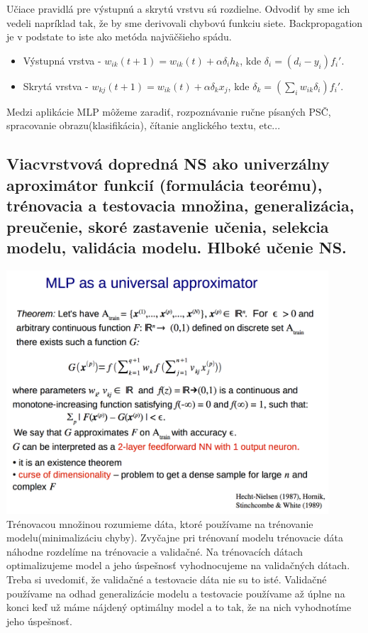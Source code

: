 \documentclass{article}
\numberwithin{equation}{section} %
\begin{document}
Učiace pravidlá pre výstupnú a skrytú vrstvu sú rozdielne. Odvodiť by sme ich vedeli napríklad tak, že by sme derivovali chybovú funkciu siete. Backpropagation je v podstate to iste ako metóda najväčšieho spádu.
\begin{itemize}
\item Výstupná vrstva - $ w_{ik}(t+1) = w_{ik}(t) + \alpha\delta_ih_k $, kde $\delta_i = (d_i - y_i)f_i'$.
\item Skrytá vrstva - $ w_{kj}(t+1) = w_{ik}(t) + \alpha\delta_kx_j $, kde $\delta_k = (\sum_iw_{ik}\delta_i)f_i'$.
\end{itemize}
Medzi aplikácie MLP môžeme zaradiť, rozpoznávanie ručne písaných PSČ, spracovanie obrazu(klasifikácia), čítanie anglického textu, etc...

\subsection{Viacvrstvová dopredná NS ako univerzálny aproximátor funkcií (formulácia teorému), trénovacia a testovacia množina, generalizácia, preučenie, skoré zastavenie učenia, selekcia modelu, validácia modelu. Hlboké učenie NS.}
\includegraphics[width=12cm]{imgs/uni_aprox}\\
Trénovacou množinou rozumieme dáta, ktoré používame na trénovanie modelu(minimalizáciu chyby). Zvyčajne pri trénovaní modelu trénovacie dáta náhodne rozdelíme na trénovacie a validačné. Na trénovacích dátach optimalizujeme model a jeho úspešnosť vyhodnocujeme na validačných dátach. Treba si uvedomiť, že validačné a testovacie dáta nie su to isté. Validačné používame na odhad generalizácie modelu a testovacie používame až úplne na konci keď už máme nájdený optimálny model a to tak, že na nich vyhodnotíme jeho úspešnosť.
\end{document}
